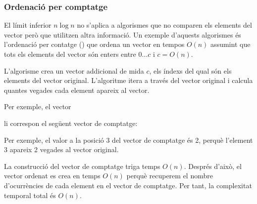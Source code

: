\subsubsection{Ordenació per comptatge}


El límit inferior $n \log n$ no s'aplica a
algorismes que no comparen els elements del vector
però que utilitzen altra informació.
Un exemple d'aquests algorismes és
l'ordenació per contatge () que ordena
un vector en tempos $O(n)$ assumint que tots els elements del
vector són enters entre $0 \ldots c$ i $c=O(n)$.

L'algorisme crea un vector addicional de mida $c$, els 
índexs del qual són els elements del vector original.
L'algoritme itera a través del vector original
i calcula quantes vegades cada element
apareix al vector.

Per exemple, el vector
\begin{centre}
\end{centre}
li correspon el seg\"uent vector de comptatge:
\begin{centre}
\end{centre}

Per exemple, el valor a la posició 3
del vector de comptatge és 2,
perquè l'element 3 apareix 2 vegades
al vector original.

La construcció del vector de comptatge
triga temps $O(n)$. Després d'això, el vector ordenat
es crea en temps $O(n)$ perquè recuperem el nombre
d'ocurrències de cada element en el vector de comptatge.
Per tant, la complexitat temporal total és $O(n)$.

